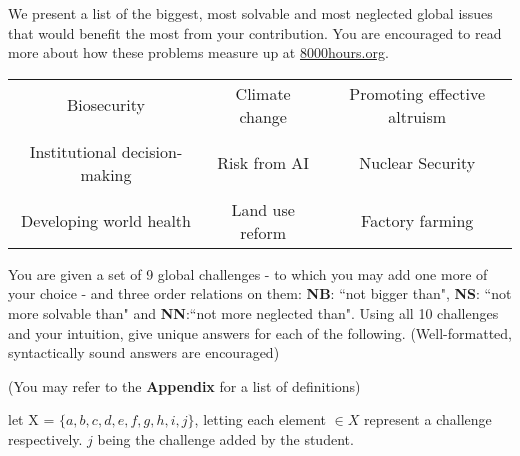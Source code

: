 \documentclass[addpoints]{exam}
\begin{document}
\begin{questions}
We present a list of the biggest, most solvable and most neglected global issues that would benefit the most from your contribution. You are encouraged to read more about how these problems measure up at \href{https://80000hours.org/articles/cause-selection/}{8000hours.org}.
\begin{center}
\begin{tabular}{ c c c}
Biosecurity & Climate change & Promoting effective altruism\\\\
Institutional decision-making & Risk from AI & Nuclear Security\\\\
Developing world health & Land use reform & Factory farming
\end{tabular}
\end{center}

You are given a set of 9 global challenges - to which you may add one more of your choice - and three order relations on them: \textbf{NB}: ``not bigger than", \textbf{NS}: ``not more solvable than" and \textbf{NN}:``not more neglected than". Using all 10 challenges and your intuition, give unique answers for each of the following. (Well-formatted, syntactically sound answers are encouraged) 


(You may refer to the \textbf{Appendix} for a list of definitions)
\begin{solution}
    
    let X = $\{a,b,c,d,e,f,g,h,i,j\}$, letting each element $\in X$ represent a challenge respectively. $j$ being the challenge added by the student.\\
    \begin{parts}
    

\end{parts}
\end{solution}
\end{questions}
\end{document}
